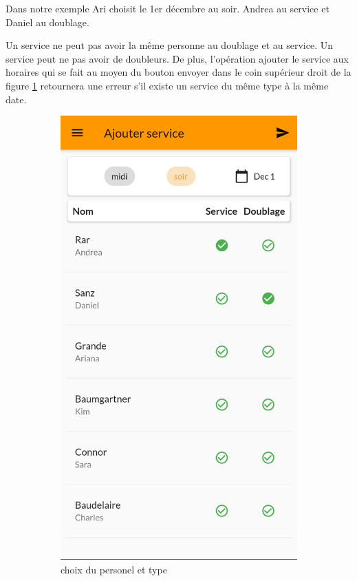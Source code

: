     Dans notre exemple Ari choisit le 1er décembre au soir. Andrea au service et Daniel au doublage.

    Un service ne peut pas avoir la même personne au doublage et au service. Un service peut ne pas avoir
    de doubleurs. De plus, l'opération ajouter le service aux horaires qui se fait au moyen du bouton envoyer
    dans le coin supérieur droit de la figure \ref{fig:ajout_service_c} retournera une erreur s'il existe un 
    service du même type à la même date.
    \begin{center}
        
    \begin{figure}[h]
        \centering
        \begin{subfigure}{.45\textwidth}
            \centering
            \includegraphics[width=0.6\linewidth]{screenshots/scenario_05/ajout_service_c.png}
            \caption{choix du personel et type}
            \label{fig:ajout_service_c}
        \end{subfigure}
        \begin{subfigure}{.45\textwidth}
            \centering

\end{subfigure}
\end{figure}
\end{center}
